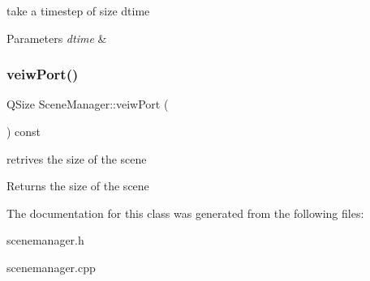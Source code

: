 take a timestep of size dtime 


\begin{DoxyParams}{Parameters}
{\em dtime} & \\
\hline
\end{DoxyParams}
\mbox{\label{class_scene_manager_ad1c7f8a0c3e2e7d9211a442cd24253d4}} 
\subsubsection{\texorpdfstring{veiw\+Port()}{veiwPort()}}
{\footnotesize\ttfamily Q\+Size Scene\+Manager\+::veiw\+Port (\begin{DoxyParamCaption}{ }\end{DoxyParamCaption}) const}



retrives the size of the scene 

\begin{DoxyReturn}{Returns}
the size of the scene 
\end{DoxyReturn}


The documentation for this class was generated from the following files\+:\begin{DoxyCompactItemize}
\item 
scenemanager.\+h\item 
scenemanager.\+cpp\end{DoxyCompactItemize}

